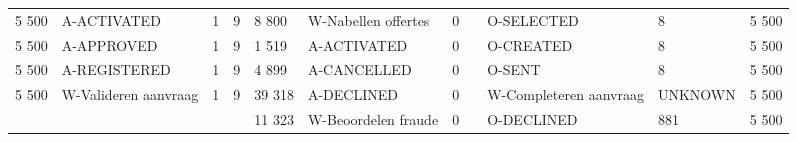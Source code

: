 \begin{tabular}{lllllllllll}
5 500 & A-ACTIVATED & 1 & 9 & 8 800 & W-Nabellen offertes & 0 &  & O-SELECTED & 8 & 5 500 \\
5 500 & A-APPROVED & 1 & 9 & 1 519 & A-ACTIVATED & 0 &  & O-CREATED & 8 & 5 500 \\
5 500 & A-REGISTERED & 1 & 9 & 4 899 & A-CANCELLED & 0 &  & O-SENT & 8 & 5 500 \\
5 500 & W-Valideren aanvraag & 1 & 9 & 39 318 & A-DECLINED & 0 &  & W-Completeren aanvraag & UNKNOWN & 5 500 \\
 &  &  &  & 11 323 & W-Beoordelen fraude & 0 &  & O-DECLINED & 881 & 5 500 \\
\bottomrule
\end{tabular}
